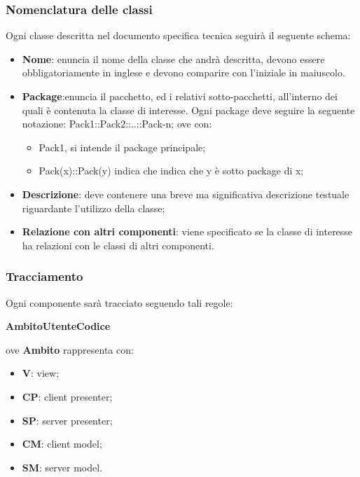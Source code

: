 \subsubsection{Nomenclatura delle classi}
Ogni classe descritta nel documento specifica tecnica seguirà il seguente schema:
\begin{itemize}
\item \textbf{Nome}: enuncia il nome della classe che andrà descritta, devono essere obbligatoriamente in inglese e devono comparire con l'iniziale in maiuscolo.
\item \textbf{Package}:enuncia il pacchetto, ed i relativi sotto-pacchetti, all'interno dei quali è contenuta la classe di interesse.
Ogni package deve seguire la seguente notazione: Pack1::Pack2::..::Pack-n;
ove con:
\begin{itemize}
\item Pack1, si intende il package principale;
\item Pack(x)::Pack(y) indica che indica che y è sotto package di x;
\end{itemize}

\item \textbf{Descrizione}: deve contenere una breve ma significativa descrizione testuale riguardante l'utilizzo della classe;
\item \textbf{Relazione con altri componenti}: viene specificato se la classe di interesse ha relazioni con le classi di altri componenti.
\end{itemize}

\subsubsection{Tracciamento}
Ogni componente sarà tracciato seguendo tali regole:\\
\begin{center}
{\textbf{Ambito}}{\textbf{Utente}}{\textbf{Codice}}
\end{center}

ove \textbf{Ambito} rappresenta con:
\begin{itemize}
\item \textbf{V}: view;
\item \textbf{CP}: client presenter;
\item \textbf{SP}: server presenter;
\item \textbf{CM}: client model;
\item \textbf{SM}: server model.
\end{itemize}

